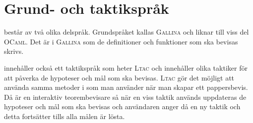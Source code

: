 \section{Grund- och taktikspråk}
\coq består av två olika delspråk. Grundspråket kallas \textsc{Gallina} och
liknar till viss del \textsc{OCaml}. Det är i \textsc{Gallina} som de
definitioner och funktioner som ska bevisas skrivs.

\coq innehåller också ett taktikspråk som heter \textsc{Ltac} och innehåller
olika taktiker för att påverka de hypoteser och mål som ska bevisas.
\textsc{Ltac} gör det möjligt att använda samma metoder i \coq som man använder
när man skapar ett pappersbevis. Då \coq är en interaktiv teorembevisare så när
en viss taktik används uppdateras de hypoteser och mål som ska bevisas och
användaren anger då en ny taktik och detta fortsätter tills alla målen är
lösta.
